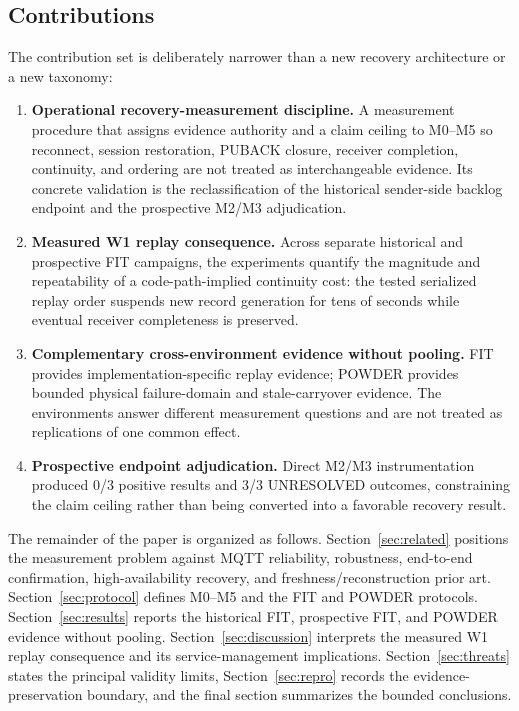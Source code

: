 \documentclass[journal]{IEEEtran}
\begin{document}
\subsection{Contributions}
The contribution set is deliberately narrower than a new recovery architecture or a new taxonomy:
\begin{enumerate}
    \item[\textbf{A1}] \textbf{Operational recovery-measurement discipline.} A measurement procedure that assigns evidence authority and a claim ceiling to M0--M5 so reconnect, session restoration, PUBACK closure, receiver completion, continuity, and ordering are not treated as interchangeable evidence. Its concrete validation is the reclassification of the historical sender-side backlog endpoint and the prospective M2/M3 adjudication.
    \item[\textbf{A2}] \textbf{Measured W1 replay consequence.} Across separate historical and prospective FIT campaigns, the experiments quantify the magnitude and repeatability of a code-path-implied continuity cost: the tested serialized replay order suspends new record generation for tens of seconds while eventual receiver completeness is preserved.
    \item[\textbf{A3}] \textbf{Complementary cross-environment evidence without pooling.} FIT provides implementation-specific replay evidence; POWDER provides bounded physical failure-domain and stale-carryover evidence. The environments answer different measurement questions and are not treated as replications of one common effect.
    \item[\textbf{A4}] \textbf{Prospective endpoint adjudication.} Direct M2/M3 instrumentation produced 0/3 positive results and 3/3 UNRESOLVED outcomes, constraining the claim ceiling rather than being converted into a favorable recovery result.
\end{enumerate}

The remainder of the paper is organized as follows. Section~\ref{sec:related} positions the measurement problem against MQTT reliability, robustness, end-to-end confirmation, high-availability recovery, and freshness/reconstruction prior art. Section~\ref{sec:protocol} defines M0--M5 and the FIT and POWDER protocols. Section~\ref{sec:results} reports the historical FIT, prospective FIT, and POWDER evidence without pooling. Section~\ref{sec:discussion} interprets the measured W1 replay consequence and its service-management implications. Section~\ref{sec:threats} states the principal validity limits, Section~\ref{sec:repro} records the evidence-preservation boundary, and the final section summarizes the bounded conclusions.
\end{document}
